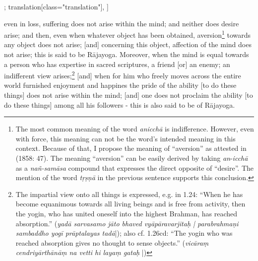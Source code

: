 \begin{alignment}[
  texts=edition[class="edition"];
  translation[class="translation"],
  ]
\begin{translation}
\begin{tlate}[p17_01]
      [and] even in loss, suffering does not arise within the mind; and neither does desire arise; and then, even when whatever object has been obtained, aversion\footnote{The most common meaning of the word \textit{anicchā} is indifference. However, even with force, this meaning can not be the word's intended meaning in this context. Because of that, I propose the meaning of ``aversion'' as attested in  (1858: 47). The meaning ``aversion'' can be easily derived by taking \textit{an}-\textit{icchā} as a \textit{nañ-samāsa} compound that expresses the direct opposite of ``desire''. The mention of the word \textit{tṛṣṇā} in the previous sentence supports this conclusion.} towards any object does not arise; [and] concerning this object, affection of the mind does not arise; this is said to be Rājayoga. Moreover, when the mind is equal towards a person who has expertise in sacred scriptures, a friend [or] an enemy; an indifferent view arises;\footnote{The impartial view onto all things is expressed, e.g. in  1.24: ``When he has become equanimous towards all living beings and is free from activity, then the yogin, who has united oneself into the highest Brahman, has reached absorption.'' (\textit{yadā sarvasamo jāto bhaved vyāpāravarjitaḥ | parabrahmaṇi sambaddho yogī prāptalayas tadā}|); also cf.  1.26cd: ``The yogin who was reached absorption gives no thought to sense objects.'' (\textit{vicāraṃ cendriyārthānāṃ na vetti hi layaṃ gataḥ} |)} [and] when for him who freely moves across the entire world furnished enjoyment and happines the pride of the ability [to do these things] does not arise within the mind; [and] one does not proclaim the ability [to do these things] among all his followers - this is also said to be of Rājayoga. 
   \flushpage
 \end{tlate}
\end{translation}
\end{alignment}
\pagebreak %
